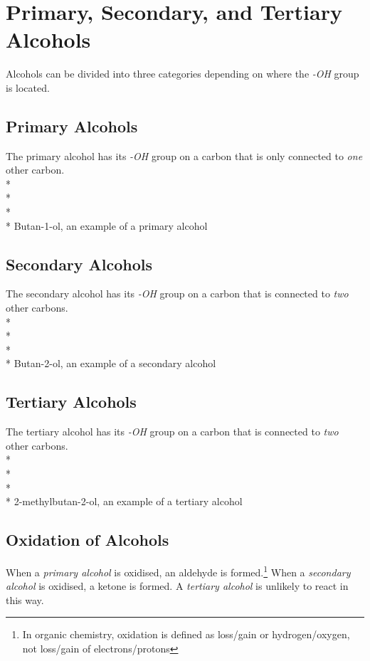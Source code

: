 \documentclass[11pt,twoside]{article}
\begin{document}
	\tableofcontents
	\section{Primary, Secondary, and Tertiary Alcohols}
		Alcohols can be divided into three categories depending on where the \emph{-OH} group is located.
		\subsection{Primary Alcohols}
			The primary alcohol has its \emph{-OH} group on a carbon that is only connected to \emph{one} other carbon. 
			\\* \\*
			\\* \\*
			Butan-1-ol, an example of a primary alcohol
		\subsection{Secondary Alcohols}
			The secondary alcohol has its \emph{-OH} group on a carbon that is connected to \emph{two} other carbons.
			\\* \\*
			\\* \\*
			Butan-2-ol, an example of a secondary alcohol
		\subsection{Tertiary Alcohols}
			The tertiary alcohol has its \emph{-OH} group on a carbon that is connected to \emph{two} other carbons.
			\\* \\*
			\\* \\*
			2-methylbutan-2-ol, an example of a tertiary alcohol
		\subsection{Oxidation of Alcohols}
			When a \emph{primary alcohol} is oxidised, an aldehyde is formed.\footnote{In organic chemistry, oxidation is defined as loss/gain or hydrogen/oxygen, not loss/gain of electrons/protons} When a \emph{secondary alcohol} is oxidised, a ketone is formed. A \emph{tertiary alcohol} is unlikely to react in this way.
\end{document}
